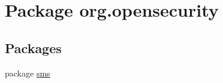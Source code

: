 \hypertarget{a00032}{\section{Package org.\+opensecurity}
\label{a00032}
}
\subsection*{Packages}
\begin{DoxyCompactItemize}
\item 
package \hyperlink{a00033}{sms}
\end{DoxyCompactItemize}
